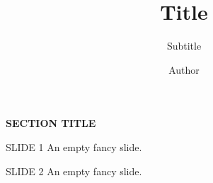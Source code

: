 \documentclass[10pt,aspectratio=169]{beamer}
\title{Title}
\subtitle{Subtitle}
\author{Author}
\institute{Affiliation}
\begin{document}
{
	\begin{frame}
		\titlepage
	\end{frame}
}

\begin{SectionTitle}
\begin{frame}
	\centering
	\vspace{0.1\textheight}
	\textbf{\LARGE SECTION TITLE}
\end{frame}
\end{SectionTitle}

\begin{frame}{SLIDE 1}
	An empty fancy slide.
\end{frame}

\begin{frame}{SLIDE 2}
	An empty fancy slide.
\end{frame}
\end{document}
